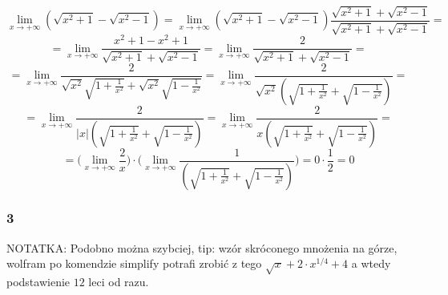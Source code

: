 \documentclass{article}
\begin{document}
\begin{equation*}
    \lim_{x \to +\infty} (\sqrt{x^2 + 1} - \sqrt{x^2 - 1}) = \lim_{x \to +\infty} (\sqrt{x^2 + 1} - \sqrt{x^2 - 1}) \frac{\sqrt{x^2 + 1} + \sqrt{x^2 - 1}}{\sqrt{x^2 + 1} + \sqrt{x^2 - 1}} =
\end{equation*}
\begin{equation*}
    = \lim_{x \to +\infty} \frac{x^2 + 1 -x^2 + 1}{\sqrt{x^2 + 1} + \sqrt{x^2 - 1}} = \lim_{x \to +\infty} \frac{2}{\sqrt{x^2 + 1} + \sqrt{x^2 - 1}} =
\end{equation*}
\begin{equation*}
    = \lim_{x \to +\infty} \frac{2}{\sqrt{x^2} \sqrt{1 + \frac{1}{x^2}} + \sqrt{x^2}\sqrt{1 - \frac{1}{x^2}}} = \lim_{x \to +\infty} \frac{2}{\sqrt{x^2}( \sqrt{1 + \frac{1}{x^2}} + \sqrt{1 - \frac{1}{x^2}})} = 
\end{equation*}
\begin{equation*}
    = \lim_{x \to +\infty} \frac{2}{|x|( \sqrt{1 + \frac{1}{x^2}} + \sqrt{1 - \frac{1}{x^2}})} = \lim_{x \to +\infty} \frac{2}{x( \sqrt{1 + \frac{1}{x^2}} + \sqrt{1 - \frac{1}{x^2}})} =
\end{equation*}
\begin{equation*}
    = \Bigg(\lim_{x \to +\infty} \frac{2}{x}\Bigg) \cdot  \Bigg(\lim_{x \to +\infty} \frac{1}{( \sqrt{1 + \frac{1}{x^2}} + \sqrt{1 - \frac{1}{x^2}})}\Bigg) = 0 \cdot \frac{1}{2} = 0
\end{equation*}

\subsubsection*{3}

\begin{center}
    NOTATKA: Podobno można szybciej, tip: wzór skróconego mnożenia na górze, wolfram po komendzie simplify
    potrafi zrobić z tego \( \sqrt{x} + 2 \cdot x^{1/4} + 4 \) a wtedy podstawienie \(12\) leci od razu.
\end{center}
\end{document}
